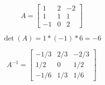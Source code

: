 \[
A=\left[
\begin{array}{ccc}
1 & 2 & -2 \\
1 & 1 & 1\\
-1 & 0 & 2
\end{array}\right]
\]
\bigskip

\[ 
\det(A)=1*(-1)*6=-6 
\] 
\bigskip

\[ 
A^{-1}=\left[ \begin{array}{ccc} -1/3 & 2/3 & -2/3 \\ 
1/2 & 0 & 1/2 \\ -1/6 & 1/3 & 1/6 \end{array} \right]
\]
